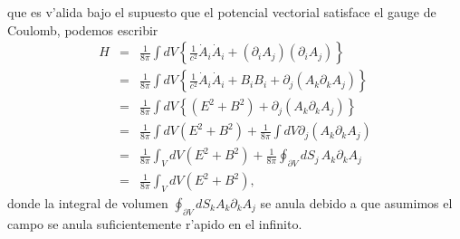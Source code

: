 que es v'alida bajo el supuesto que el potencial vectorial satisface el gauge de
Coulomb, podemos escribir
\begin{eqnarray}
H & = &\frac{1}{8\pi}\int dV\left\{ \frac
{1}{c^{2}}\dot{A}_{i}\dot{A}_{i}+\left( \partial_{i}A_{j}\right) \left(
\partial_{i}A_{j}\right) \right\} \nonumber\\
& = &\frac{1}{8\pi}\int dV\left\{ \frac{1}{c^{2}}\dot{A}_{i}\dot{A}%
_{i}+B_{i}B_{i}+\partial_{j}\left( A_{k}\partial_{k}A_{j}\right) \right\}
\nonumber\\
& = &\frac{1}{8\pi}\int dV\left\{ \left(E^{2}+B^{2}\right) +\partial_{j}\left(
A_{k}\partial_{k}A_{j}\right) \right\} \nonumber\\
& = &\frac{1}{8\pi}\int dV\left( E^{2}+B^{2}\right) +\frac{1}{8\pi}\int
dV\partial_{j}\left( A_{k}%
\partial_{k}A_{j}\right) \nonumber\\
& = &\frac{1}{8\pi}\int_{V}dV\left( E^{2}+B^{2}\right)
+\frac{1}{8\pi}\oint_{\partial V}dS_{j}\,A_{k}\partial_{k}%
A_{j}\nonumber\\
& = &\frac{1}{8\pi}\int_{V}dV\left( E^{2}+B^{2}\right),\label{Energia del Campo
EM2}%
\end{eqnarray}
donde la integral de volumen $\oint_{\partial V}dS_{k}A_{k}\partial_{k}A_{j}$ se
anula debido a que asumimos el campo se anula suficientemente r'apido en el
infinito.

